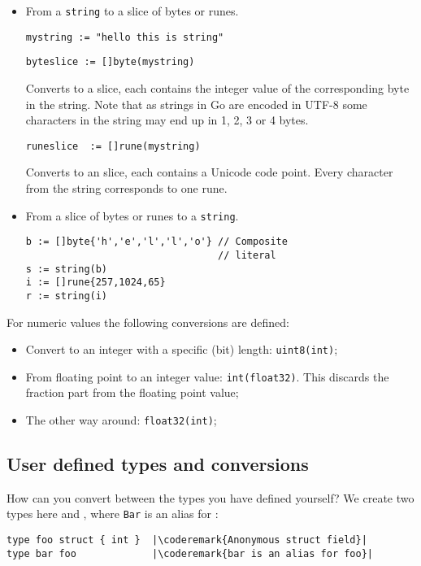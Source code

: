 \begin{table}[H]
\begin{center}
\caption[Valid conversions]{Valid conversions,
\lstinline{float64} works the same as \lstinline{float32}. Note that
float32 has been abbreviated to flt32 in this table to make it fit on the page.}
\label{tab:convesion}

\end{center}
\end{table}

\begin{itemize}
\item{
From a \lstinline{string} to a slice of bytes or runes.
\begin{lstlisting}
mystring := "hello this is string"
\end{lstlisting}

\begin{lstlisting}
byteslice := []byte(mystring)
\end{lstlisting}
Converts to a  slice, each  contains the integer value
of the corresponding byte in the string. Note that as strings in Go
are encoded in UTF-8 some characters in the string may end up in 1, 2, 3
or 4 bytes.
\begin{lstlisting}
runeslice  := []rune(mystring)
\end{lstlisting}
Converts to an  slice, each  contains a Unicode code
point. Every character from the string corresponds to one rune.
}
\item{
From a slice of bytes or runes to a \lstinline{string}.
\begin{lstlisting}
b := []byte{'h','e','l','l','o'} // Composite 
                                 // literal
s := string(b)
i := []rune{257,1024,65} 
r := string(i)
\end{lstlisting}
}
\end{itemize}
For numeric values the following conversions are defined:
\begin{itemize}
\item{Convert to an integer with a specific (bit) length:
\lstinline{uint8(int)};}
\item{From floating point to an integer value: 
\lstinline{int(float32)}. This discards the fraction part
from the floating point value;}
\item{The other way around: \lstinline{float32(int)};}
\end{itemize}

\subsection{User defined types and conversions}
How can you convert between the types you have defined
yourself?
We create two types here  and , where
\lstinline{Bar} is an alias for :
\begin{lstlisting}
type foo struct { int }  |\coderemark{Anonymous struct field}|
type bar foo             |\coderemark{bar is an alias for foo}|
\end{lstlisting}

